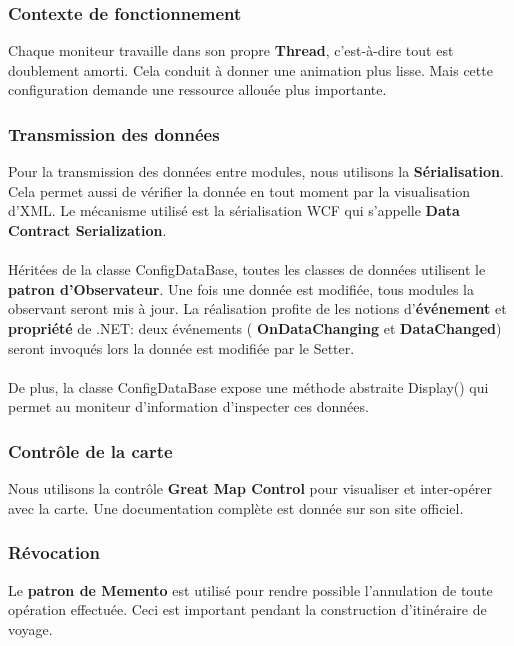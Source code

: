 \documentclass{article}
\begin{document}
\vspace{0.2 cm}
\subsubsection{\large Contexte de fonctionnement}
Chaque moniteur travaille dans son propre \textbf{Thread}, c'est-à-dire tout est doublement amorti. Cela conduit à donner une animation plus lisse. Mais cette configuration demande une ressource allouée plus importante. 

\vspace{0.2 cm}
\subsubsection{\large Transmission des données}
Pour la transmission des données entre modules, nous utilisons la \textbf{Sérialisation}. Cela permet aussi de vérifier la donnée en tout moment par la visualisation d'XML. Le mécanisme utilisé est la sérialisation WCF qui s'appelle \textbf{Data Contract Serialization}.
\\\\Héritées de la classe ConfigDataBase, toutes les classes de données utilisent le \textbf{patron d'Observateur}. Une fois une donnée est modifiée, tous modules la observant seront mis à jour. La réalisation profite de les notions d'\textbf{événement} et \textbf{propriété} de .NET: deux événements ( \textbf{OnDataChanging} et  \textbf{DataChanged}) seront invoqués lors la donnée est modifiée par le Setter.
\\\\De plus, la classe ConfigDataBase expose une méthode abstraite Display() qui permet au moniteur d'information d'inspecter ces données. 

\vspace{0.2 cm}
\subsubsection{\large Contrôle de la carte}
Nous utilisons la contrôle \textbf{Great Map Control} pour visualiser et inter-opérer avec la carte. Une documentation complète est donnée sur son site officiel.  

\vspace{0.2 cm}
\subsubsection{\large Révocation}
Le \textbf{patron de Memento} est utilisé pour rendre possible l'annulation de toute opération effectuée. Ceci est important pendant la construction d'itinéraire de voyage.
\end{document}
